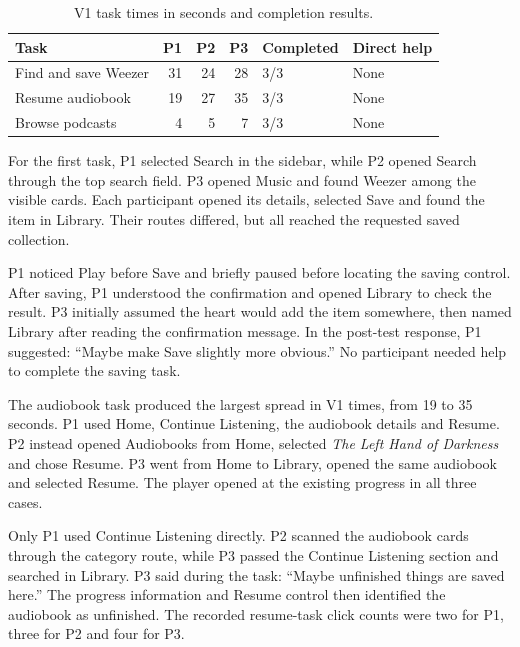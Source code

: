 \begin{table}[!htbp]
  \centering
  \caption{V1 task times in seconds and completion results.}
  \label{tab:results-v1}
  \begingroup
  \small
  \renewcommand{\arraystretch}{1.3}
  \begin{tabular}{@{}p{}rrrp{}l@{}}
    \hline
    \textbf{Task} & \textbf{P1} & \textbf{P2} & \textbf{P3} &
    \textbf{Completed} & \textbf{Direct help} \\
    \hline
    Find and save Weezer & 31 & 24 & 28 & 3/3 & None \\
    Resume audiobook & 19 & 27 & 35 & 3/3 & None \\
    Browse podcasts & 4 & 5 & 7 & 3/3 & None \\
    \hline
  \end{tabular}
  \endgroup
\end{table}

For the first task, P1 selected Search in the sidebar, while P2 opened
Search through the top search field. P3 opened Music and found Weezer among
the visible cards. Each participant opened its details, selected Save and
found the item in Library. Their routes differed, but all reached the
requested saved collection.

P1 noticed Play before Save and briefly paused before locating the saving
control. After saving, P1 understood the confirmation and opened Library
to check the result. P3 initially assumed the heart would add the item
somewhere, then named Library after reading the confirmation message.
In the post-test response, P1 suggested: ``Maybe make Save slightly more
obvious.'' No participant needed help to complete the saving task.

The audiobook task produced the largest spread in V1 times, from 19 to
35 seconds. P1 used Home, Continue Listening, the audiobook details and
Resume. P2 instead opened Audiobooks from Home, selected
\emph{The Left Hand of Darkness} and chose Resume. P3 went from Home to
Library, opened the same audiobook and selected Resume. The player opened
at the existing progress in all three cases.

Only P1 used Continue Listening directly. P2 scanned the audiobook cards
through the category route, while P3 passed the Continue Listening section
and searched in Library. P3 said during the task: ``Maybe unfinished things
are saved here.'' The progress information and Resume control then identified
the audiobook as unfinished. The recorded resume-task click counts were
two for P1, three for P2 and four for P3.

